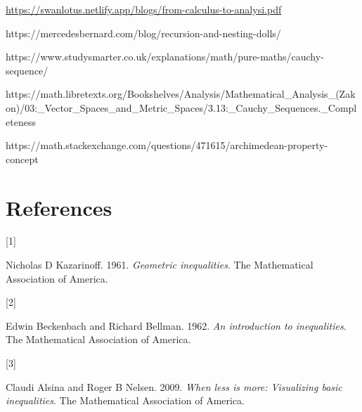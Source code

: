 \documentclass[
  a4paper,
]{article}
\newlength{\cslhangindent}
\newlength{\csllabelwidth}
\newenvironment{CSLReferences}[2] %
 {\begin{list}{}{%
  \setlength{\itemindent}{0pt}
  \setlength{\leftmargin}{0pt}
  \setlength{\parsep}{0pt}
  \ifodd #1
   \setlength{\leftmargin}{\cslhangindent}
   \setlength{\itemindent}{-1\cslhangindent}
  \fi
  \setlength{\itemsep}{#2\baselineskip}}}
 {\end{list}}
\newcommand{\CSLLeftMargin}[1]{\parbox[t]{\csllabelwidth}{\strut#1\strut}}
\newcommand{\CSLRightInline}[1]{\parbox[t]{\linewidth - \csllabelwidth}{\strut#1\strut}}
\begin{document}
\begin{small}

\begin{sffamily}

\url{https://swanlotus.netlify.app/blogs/from-calculus-to-analysi.pdf}

\end{sffamily}

\end{small}

https://mercedesbernard.com/blog/recursion-and-nesting-dolls/

https://www.studysmarter.co.uk/explanations/math/pure-maths/cauchy-sequence/

https://math.libretexts.org/Bookshelves/Analysis/Mathematical\_Analysis\_(Zakon)/03:\_Vector\_Spaces\_and\_Metric\_Spaces/3.13:\_Cauchy\_Sequences.\_Completeness

https://math.stackexchange.com/questions/471615/archimedean-property-concept

\section*{References}\label{bibliography}

\label{refs}
\begin{CSLReferences}{0}{0}
\CSLLeftMargin{{[}1{]} }%
\CSLRightInline{Nicholas D Kazarinoff. 1961. \emph{Geometric
inequalities}. The Mathematical Association of America.}

\CSLLeftMargin{{[}2{]} }%
\CSLRightInline{Edwin Beckenbach and Richard Bellman. 1962. \emph{An
introduction to inequalities}. The Mathematical Association of America.}

\CSLLeftMargin{{[}3{]} }%
\CSLRightInline{Claudi Alsina and Roger B Nelsen. 2009. \emph{When less
is more: Visualizing basic inequalities}. The Mathematical Association
of America.}

\end{CSLReferences}
\end{document}
